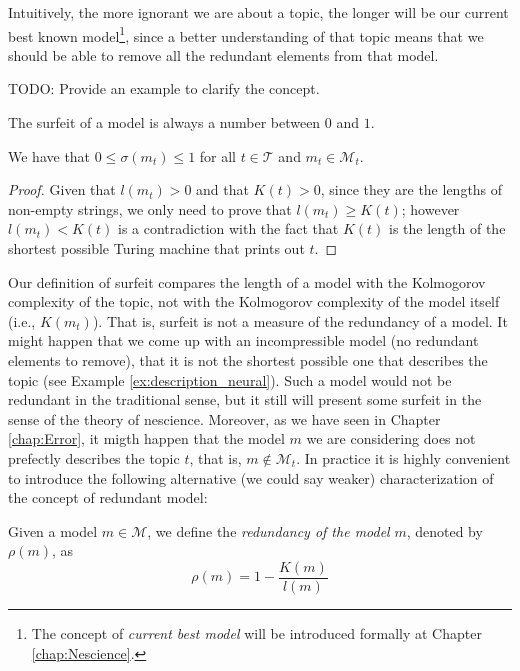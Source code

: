 Intuitively, the more ignorant we are about a topic, the longer will be our current best known model\footnote{The concept of \emph{current best model} will be introduced formally at Chapter \ref{chap:Nescience}.}, since a better understanding of that topic means that we should be able to remove all the redundant elements from that model.

\begin{example}
{\color{red} TODO: Provide an example to clarify the concept.}
\end{example}

The surfeit of a model is always a number between $0$ and $1$.

\begin{proposition}
\label{prop:range_redundancy}
We have that $0 \leq \sigma(m_t) \leq 1$ for all $t \in \mathcal{T}$ and $m_t \in \mathcal{M}_t$.
\end{proposition}
\begin{proof}
Given that $l\left(m_t\right)>0$ and that $K\left(t\right)>0$, since they are the lengths of non-empty strings, we only need to prove that $l\left(m_t\right) \geq K\left(t\right)$; however $l\left(m_t\right) < K\left(t\right)$ is a contradiction with the fact that $K\left(t\right)$ is the length of the shortest possible Turing machine that prints out $t$.
\end{proof}

Our definition of surfeit compares the length of a model with the Kolmogorov complexity of the topic, not with the Kolmogorov complexity of the model itself (i.e., $K(m_t)$). That is, surfeit is not a measure of the redundancy of a model. It might happen that we come up with an incompressible model (no redundant elements to remove), that it is not the shortest possible one that describes the topic (see Example \ref{ex:description_neural}). Such a model would not be redundant in the traditional sense, but it still will present some surfeit in the sense of the theory of nescience. Moreover, as we have seen in Chapter \ref{chap:Error}, it migth happen that the model $m$ we are considering does not prefectly describes the topic $t$, that is, $m \notin \mathcal{M}_t$. In practice it is highly convenient to introduce the following alternative (we could say weaker) characterization of the concept of redundant model:

\begin{definition}[Redundancy]
Given a model $m \in \mathcal{M}$, we define the \emph{redundancy of the model} $m$, denoted by $\rho(m)$, as
\[
\rho(m) = 1 - \frac{K(m)}{l(m)}
\]
\end{definition}

